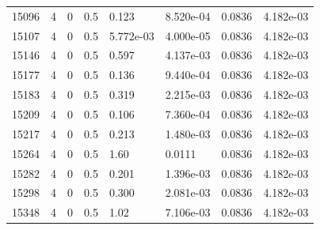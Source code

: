 \documentclass[preview]{standalone}
\begin{document}
{{{{{{{{{{{{{{{{\begin{tabular}{L{1.2cm}C{1.2cm} C{0.3cm}C{0.5cm} C{1.4cm}C{1.4cm} C{1.4cm}C{1.4cm}}
  15096  &     4  & 0     & 0.5 &  0.123  & 8.520e-04  & 0.0836 &  4.182e-03   \\ 
  15107  &     4  & 0     & 0.5 &  5.772e-03  & 4.000e-05  & 0.0836 &  4.182e-03   \\ 
  15146  &     4  & 0     & 0.5 &  0.597  & 4.137e-03  & 0.0836 &  4.182e-03   \\ 
  15177  &     4  & 0     & 0.5 &  0.136  & 9.440e-04  & 0.0836 &  4.182e-03   \\ 
  15183  &     4  & 0     & 0.5 &  0.319  & 2.215e-03  & 0.0836 &  4.182e-03   \\ 
  15209  &     4  & 0     & 0.5 &  0.106  & 7.360e-04  & 0.0836 &  4.182e-03   \\ 
  15217  &     4  & 0     & 0.5 &  0.213  & 1.480e-03  & 0.0836 &  4.182e-03   \\ 
  15264  &     4  & 0     & 0.5 &  1.60  & 0.0111  & 0.0836 &  4.182e-03   \\ 
  15282  &     4  & 0     & 0.5 &  0.201  & 1.396e-03  & 0.0836 &  4.182e-03   \\ 
  15298  &     4  & 0     & 0.5 &  0.300  & 2.081e-03  & 0.0836 &  4.182e-03   \\ 
  15348  &     4  & 0     & 0.5 &  1.02  & 7.106e-03  & 0.0836 &  4.182e-03   \\ 
\hline 
\end{tabular} 

}}}}}}}}}}}}}}}}
\end{document}
